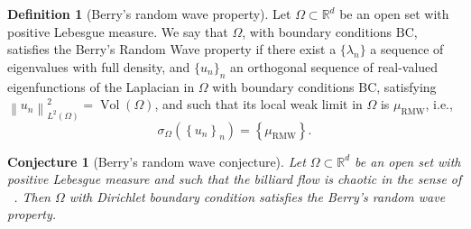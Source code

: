 \documentclass{amsart}
\newtheorem{conjecture}[theorem]{Conjecture}
\theoremstyle{definition}
\newtheorem{definition}[theorem]{Definition}
\theoremstyle{remark}
\DeclareMathOperator\Vol{Vol} \DeclareMathOperator\GL{GL} \DeclareMathOperator\orto{O}
\numberwithin{equation}{section}
\theoremstyle{definition}
\theoremstyle{remark}
\newcommand\muRMW{\mu_{\mathrm{RMW}}}
\begin{document}
\begin{definition}[Berry’s random wave property]\label{BerryLWL}
    Let $\Omega\subset\mathbb{R}^d$ be an open set with positive Lebesgue measure. We say that $\Omega$, with boundary conditions $\mathrm{BC}$, satisfies the Berry's Random Wave property if there exist a $\{\lambda_n\}$ a sequence of eigenvalues with full density, and $\{u_n\}_n$ an orthogonal sequence of real-valued eigenfunctions of the Laplacian in $\Omega$ with boundary conditions $\mathrm{BC}$, satisfying $\left\|u_n\right\|_{L^2(\Omega)}^2=\Vol(\Omega)$, and such that its local weak limit in $\Omega$ is $\muRMW$, i.e.,  \begin{equation}
		\sigma_\Omega\left(\left\{u_n\right\}_n\right)=\left\{\muRMW\right\}.
	\end{equation}
\end{definition}

\begin{conjecture}[Berry’s random wave conjecture]
	
	Let $\Omega\subset\mathbb{R}^d$ be an open set with positive Lebesgue measure and such that the billiard flow is chaotic in the sense of ~\cite[Section 2]{cbilliards}. Then $\Omega$ with Dirichlet boundary condition satisfies the Berry's random wave property.
\end{conjecture}
\end{document}
